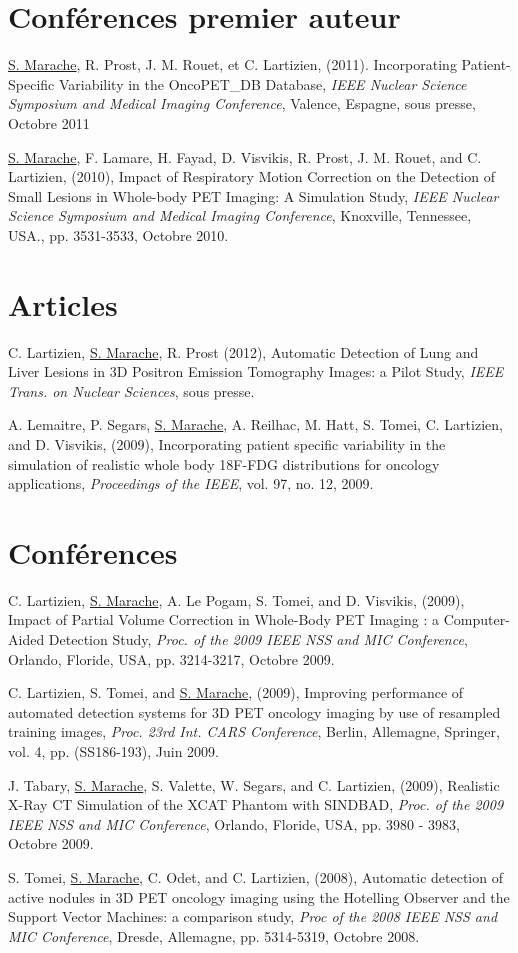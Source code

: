 
\section*{Conférences premier auteur}
\underline{S. Marache}, R. Prost, J. M. Rouet, et C. Lartizien, (2011). Incorporating Patient-Specific Variability in the OncoPET\_DB Database, \textit{IEEE Nuclear Science Symposium and Medical Imaging Conference}, Valence, Espagne, sous presse, Octobre 2011 

\underline{S. Marache}, F. Lamare, H. Fayad, D. Visvikis, R. Prost, J. M. Rouet, and C. Lartizien, (2010), Impact of Respiratory Motion Correction on the Detection of Small Lesions in Whole-body PET Imaging: A Simulation Study, \textit{IEEE Nuclear Science Symposium and Medical Imaging Conference}, Knoxville, Tennessee, USA., pp. 3531-3533, Octobre 2010.

\section*{Articles}
C. Lartizien, \underline{S. Marache}, R. Prost (2012), Automatic Detection of Lung and Liver Lesions in 3D Positron Emission Tomography Images: a Pilot Study, \textit{IEEE Trans. on Nuclear Sciences}, sous presse.

A. Lemaitre, P. Segars, \underline{S. Marache}, A. Reilhac, M. Hatt, S. Tomei, C. Lartizien, and D. Visvikis, (2009), Incorporating patient specific variability in the simulation of realistic whole body 18F-FDG distributions for oncology applications, \textit{Proceedings of the IEEE}, vol. 97, no. 12, 2009.


\section*{Conférences}
C. Lartizien, \underline{S. Marache}, A. Le Pogam, S. Tomei, and D. Visvikis, (2009), Impact of Partial Volume Correction in Whole-Body PET Imaging : a Computer-Aided Detection Study, \textit{Proc. of the 2009 IEEE NSS and MIC Conference}, Orlando, Floride, USA, pp. 3214-3217, Octobre 2009.

C. Lartizien, S. Tomei, and \underline{S. Marache}, (2009), Improving performance of automated detection systems for 3D PET oncology imaging by use of resampled training images, \textit{Proc. 23rd Int. CARS Conference}, Berlin, Allemagne, Springer, vol. 4, pp. (SS186-193), Juin 2009.

J. Tabary, \underline{S. Marache}, S. Valette, W. Segars, and C. Lartizien, (2009), Realistic X-Ray CT Simulation of the XCAT Phantom with SINDBAD, \textit{Proc. of the 2009 IEEE NSS and MIC Conference}, Orlando, Floride, USA, pp. 3980 - 3983, Octobre 2009.

S. Tomei, \underline{S. Marache}, C. Odet, and C. Lartizien, (2008), Automatic detection of active nodules in 3D PET oncology imaging using the Hotelling Observer and the Support Vector Machines: a comparison study, \textit{Proc of the 2008 IEEE NSS and MIC Conference}, Dresde, Allemagne, pp. 5314-5319, Octobre 2008.
